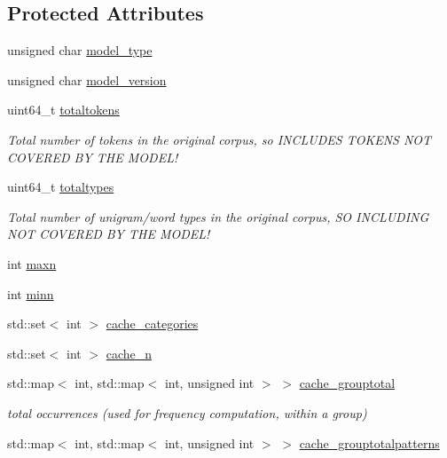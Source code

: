 \subsection*{Protected Attributes}
\begin{DoxyCompactItemize}
\item 
unsigned char \hyperlink{classPatternModel_af28152ff3d5060e48c18423b8629d1eb}{model\+\_\+type}
\item 
unsigned char \hyperlink{classPatternModel_a032f1517ae658e81fa2ca3360aba62a2}{model\+\_\+version}
\item 
uint64\+\_\+t \hyperlink{classPatternModel_a4667c917fab96ae756ee61693220f44e}{totaltokens}
\begin{DoxyCompactList}\small\item\em Total number of tokens in the original corpus, so I\+N\+C\+L\+U\+D\+E\+S T\+O\+K\+E\+N\+S N\+O\+T C\+O\+V\+E\+R\+E\+D B\+Y T\+H\+E M\+O\+D\+E\+L! \end{DoxyCompactList}\item 
uint64\+\_\+t \hyperlink{classPatternModel_af9de224847465b75a9be436b1990cef7}{totaltypes}
\begin{DoxyCompactList}\small\item\em Total number of unigram/word types in the original corpus, S\+O I\+N\+C\+L\+U\+D\+I\+N\+G N\+O\+T C\+O\+V\+E\+R\+E\+D B\+Y T\+H\+E M\+O\+D\+E\+L! \end{DoxyCompactList}\item 
int \hyperlink{classPatternModel_ac0e501edfcca21facfe0137ed5140c87}{maxn}
\item 
int \hyperlink{classPatternModel_abed492e59e656226b1c48b10c2904618}{minn}
\item 
std\+::set$<$ int $>$ \hyperlink{classPatternModel_a2f9145b11bff161df5db3bcd33300319}{cache\+\_\+categories}
\item 
std\+::set$<$ int $>$ \hyperlink{classPatternModel_a18c0c93e988cce16fdeb5a8a65e878b1}{cache\+\_\+n}
\item 
std\+::map$<$ int, std\+::map$<$ int, unsigned int $>$ $>$ \hyperlink{classPatternModel_a8ef56e648dc462352079542e9528df09}{cache\+\_\+grouptotal}
\begin{DoxyCompactList}\small\item\em total occurrences (used for frequency computation, within a group) \end{DoxyCompactList}\item 
std\+::map$<$ int, std\+::map$<$ int, unsigned int $>$ $>$ \hyperlink{classPatternModel_a05db7c45b9368438f34dba519df3bb3e}{cache\+\_\+grouptotalpatterns}

\end{DoxyCompactItemize}
